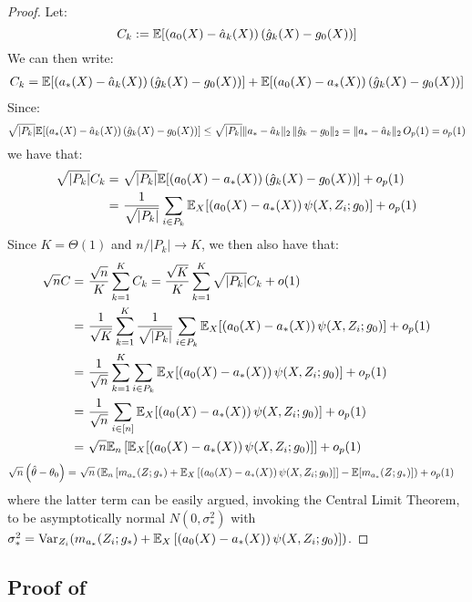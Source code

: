\begin{proof}
Let:
\begin{equation}
    C_k := \mathbb{E}[(a_0(X) - \hat{a}_k(X))\, (\hat{g}_k(X) - g_0(X))] 
\end{equation}
We can then write:
\begin{align}
    C_k =  \mathbb{E}[(a_*(X) - \hat{a}_k(X))\, (\hat{g}_k(X) - g_0(X))] + \mathbb{E}[(a_0(X) - a_*(X))\, (\hat{g}_k(X) - g_0(X))]
\end{align}
Since:
\begin{equation}
\sqrt{|P_k|}\mathbb{E}[(a_*(X) - \hat{a}_k(X))\, (\hat{g}_k(X) - g_0(X))]\leq \sqrt{|P_k|} \|a_* - \hat{a}_k\|_2 \, \|\hat{g}_k - g_0\|_2 = \|a_* - \hat{a}_k\|_2\, O_p(1) = o_p(1)
\end{equation}
we have that:
\begin{align}
    \sqrt{|P_k|} C_k =~& \sqrt{|P_k|}\mathbb{E}[(a_0(X) - a_*(X))\, (\hat{g}_k(X) - g_0(X))] + o_p(1)\\
    =~& \frac{1}{\sqrt{|P_k|}} \sum_{i\in P_k} \mathbb{E}_X[(a_0(X) - a_*(X))\,\psi(X, Z_i; g_0)] + o_p(1)
\end{align}
Since $K=\Theta(1)$ and $n/|P_k| \to K$, we then also have that:
\begin{align}
    \sqrt{n} C =~& \frac{\sqrt{n}}{K} \sum_{k=1}^K C_k =  \frac{\sqrt{K}}{K} \sum_{k=1}^K \sqrt{|P_k|} C_k + o(1)\\
    =~& \frac{1}{\sqrt{K}} \sum_{k=1}^K \frac{1}{\sqrt{|P_k|}} \sum_{i\in P_k} \mathbb{E}_X[(a_0(X) - a_*(X))\,\psi(X, Z_i; g_0)] + o_p(1)\\
    =~& \frac{1}{\sqrt{n}} \sum_{k=1}^K \sum_{i\in P_k} \mathbb{E}_X[(a_0(X) - a_*(X))\,\psi(X, Z_i; g_0)] + o_p(1)\\
    =~& \frac{1}{\sqrt{n}} \sum_{i\in [n]} \mathbb{E}_X[(a_0(X) - a_*(X))\,\psi(X, Z_i; g_0)] + o_p(1)\\
    =~& \sqrt{n} \mathbb{E}_n\left[\mathbb{E}_X[(a_0(X) - a_*(X))\,\psi(X,Z_i; g_0)]\right] + o_p(1)
\end{align}
\begin{align}
    \sqrt{n}\left(\hat{\theta}-\theta_0\right) =~& \sqrt{n} \left(\mathbb{E}_n\left[m_{a_*}(Z; g_*) + \mathbb{E}_X\left[(a_0(X) - a_*(X))\,\psi(X, Z_i; g_0)\right]\right] - \mathbb{E}[m_{a_*}(Z; g_*)]\right)  + o_p(1)
\end{align}
where the latter term can be easily argued, invoking the Central Limit Theorem, to be asymptotically normal $N(0, \sigma_*^2)$ with $\sigma_*^2 =\text{Var}_{Z_i}(m_{a_*}(Z_i; g_*) + \mathbb{E}_X\left[(a_0(X) - a_*(X))\,\psi(X, Z_i; g_0)\right])$.
\end{proof}


\subsection{Proof of }

